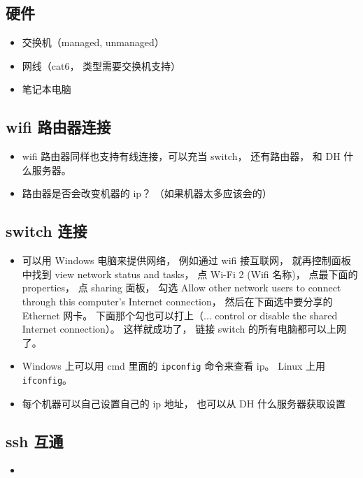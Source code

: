 
\begin{issues}
\issueDraft
\end{issues}

\subsection{硬件}
\begin{itemize}
\item 交换机（managed, unmanaged）
\item 网线（cat6， 类型需要交换机支持）
\item 笔记本电脑
\end{itemize}

\subsection{wifi 路由器连接}
\begin{itemize}
\item wifi 路由器同样也支持有线连接，可以充当 switch， 还有路由器， 和 DH 什么服务器。
\item 路由器是否会改变机器的 ip？ （如果机器太多应该会的）
\end{itemize}


\subsection{switch 连接}
\begin{itemize}
\item 可以用 Windows 电脑来提供网络， 例如通过 wifi 接互联网， 就再控制面板中找到 view network status and tasks， 点 Wi-Fi 2 (Wifi 名称)， 点最下面的 properties， 点 sharing 面板， 勾选 Allow other network users to connect through this computer's Internet connection， 然后在下面选中要分享的 Ethernet 网卡。 下面那个勾也可以打上（... control or disable the shared Internet connection）。 这样就成功了， 链接 switch 的所有电脑都可以上网了。
\item Windows 上可以用 cmd 里面的 \verb|ipconfig| 命令来查看 ip。 Linux 上用 \verb|ifconfig|。
\item 每个机器可以自己设置自己的 ip 地址， 也可以从 DH 什么服务器获取设置
\end{itemize}

\subsection{ssh 互通}
\begin{itemize}
\item 
\end{itemize}

